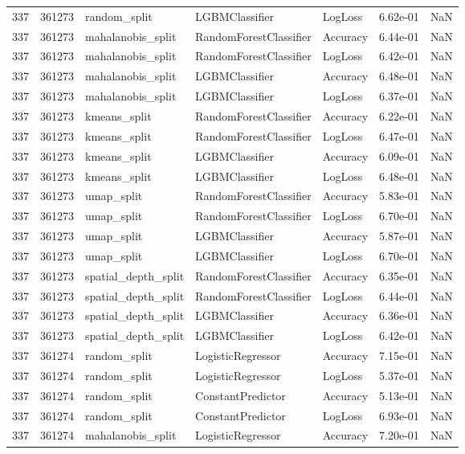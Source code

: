 \begin{tabular}{rrlllrr}
337 & 361273 & random\_split & LGBMClassifier & LogLoss & 6.62e-01 & NaN \\
337 & 361273 & mahalanobis\_split & RandomForestClassifier & Accuracy & 6.44e-01 & NaN \\
337 & 361273 & mahalanobis\_split & RandomForestClassifier & LogLoss & 6.42e-01 & NaN \\
337 & 361273 & mahalanobis\_split & LGBMClassifier & Accuracy & 6.48e-01 & NaN \\
337 & 361273 & mahalanobis\_split & LGBMClassifier & LogLoss & 6.37e-01 & NaN \\
337 & 361273 & kmeans\_split & RandomForestClassifier & Accuracy & 6.22e-01 & NaN \\
337 & 361273 & kmeans\_split & RandomForestClassifier & LogLoss & 6.47e-01 & NaN \\
337 & 361273 & kmeans\_split & LGBMClassifier & Accuracy & 6.09e-01 & NaN \\
337 & 361273 & kmeans\_split & LGBMClassifier & LogLoss & 6.48e-01 & NaN \\
337 & 361273 & umap\_split & RandomForestClassifier & Accuracy & 5.83e-01 & NaN \\
337 & 361273 & umap\_split & RandomForestClassifier & LogLoss & 6.70e-01 & NaN \\
337 & 361273 & umap\_split & LGBMClassifier & Accuracy & 5.87e-01 & NaN \\
337 & 361273 & umap\_split & LGBMClassifier & LogLoss & 6.70e-01 & NaN \\
337 & 361273 & spatial\_depth\_split & RandomForestClassifier & Accuracy & 6.35e-01 & NaN \\
337 & 361273 & spatial\_depth\_split & RandomForestClassifier & LogLoss & 6.44e-01 & NaN \\
337 & 361273 & spatial\_depth\_split & LGBMClassifier & Accuracy & 6.36e-01 & NaN \\
337 & 361273 & spatial\_depth\_split & LGBMClassifier & LogLoss & 6.42e-01 & NaN \\
337 & 361274 & random\_split & LogisticRegressor & Accuracy & 7.15e-01 & NaN \\
337 & 361274 & random\_split & LogisticRegressor & LogLoss & 5.37e-01 & NaN \\
337 & 361274 & random\_split & ConstantPredictor & Accuracy & 5.13e-01 & NaN \\
337 & 361274 & random\_split & ConstantPredictor & LogLoss & 6.93e-01 & NaN \\
337 & 361274 & mahalanobis\_split & LogisticRegressor & Accuracy & 7.20e-01 & NaN \\

\end{tabular}
